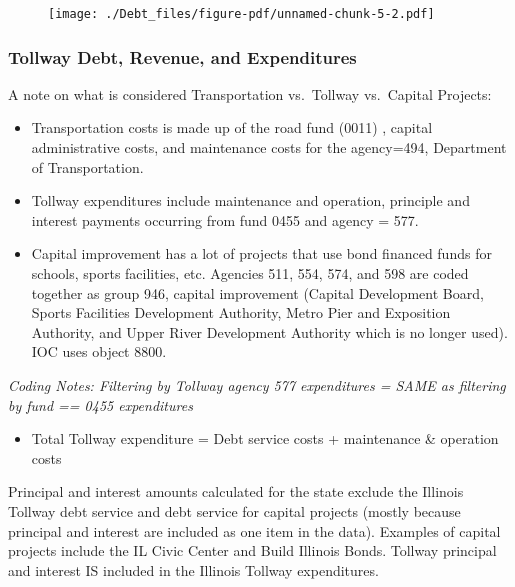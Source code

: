 \documentclass[
  letterpaper,
  DIV=11,
  numbers=noendperiod]{scrreport}
\providecommand{\tightlist}{%
  \setlength{\itemsep}{0pt}\setlength{\parskip}{0pt}}\usepackage{longtable,booktabs,array}
\begin{document}
\begin{figure}[H]

{\centering \texttt{[image: ./Debt\_files/figure-pdf/unnamed-chunk-5-2.pdf]}

}

\end{figure}

\hypertarget{tollway-debt-revenue-and-expenditures}{%
\subsubsection{Tollway Debt, Revenue, and
Expenditures}\label{tollway-debt-revenue-and-expenditures}}

A note on what is considered Transportation vs.~Tollway vs.~Capital
Projects:

\begin{itemize}
\tightlist
\item
  Transportation costs is made up of the road fund (0011) , capital
  administrative costs, and maintenance costs for the agency=494,
  Department of Transportation.
\item
  Tollway expenditures include maintenance and operation, principle and
  interest payments occurring from fund 0455 and agency = 577.
\item
  Capital improvement has a lot of projects that use bond financed funds
  for schools, sports facilities, etc. Agencies 511, 554, 574, and 598
  are coded together as group 946, capital improvement (Capital
  Development Board, Sports Facilities Development Authority, Metro Pier
  and Exposition Authority, and Upper River Development Authority which
  is no longer used). IOC uses object 8800.
\end{itemize}

\emph{Coding Notes: Filtering by Tollway agency 577 expenditures = SAME
as filtering by fund == 0455 expenditures}

\begin{itemize}
\tightlist
\item
  Total Tollway expenditure = Debt service costs + maintenance \&
  operation costs
\end{itemize}

Principal and interest amounts calculated for the state exclude the
Illinois Tollway debt service and debt service for capital projects
(mostly because principal and interest are included as one item in the
data). Examples of capital projects include the IL Civic Center and
Build Illinois Bonds. Tollway principal and interest IS included in the
Illinois Tollway expenditures.
\end{document}
